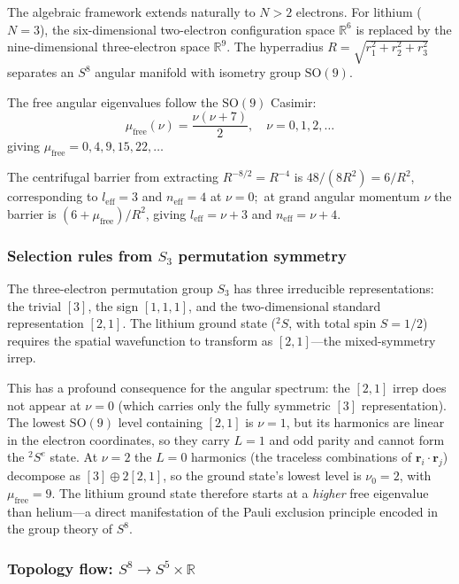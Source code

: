 \documentclass[aps,pra,twocolumn,superscriptaddress,longbibliography]{revtex4-2}
\begin{document}
The algebraic framework extends naturally to $N > 2$ electrons.
For lithium ($N = 3$), the six-dimensional two-electron
configuration space $\mathbb{R}^6$ is replaced by the
nine-dimensional three-electron space $\mathbb{R}^9$.  The
hyperradius $R = \sqrt{r_1^2 + r_2^2 + r_3^2}$ separates an
$S^8$ angular manifold with isometry group $\mathrm{SO}(9)$.

The free angular eigenvalues follow the $\mathrm{SO}(9)$ Casimir:
\begin{equation}
  \mu_{\mathrm{free}}(\nu) = \frac{\nu(\nu + 7)}{2},
  \quad \nu = 0, 1, 2, \ldots
  \label{eq:casimir_li}
\end{equation}
giving $\mu_{\mathrm{free}} = 0, 4, 9, 15, 22, \ldots$

The centrifugal barrier from extracting $R^{-8/2} = R^{-4}$
is $48/(8R^2) = 6/R^2$, corresponding to $l_{\mathrm{eff}} = 3$
and $n_{\mathrm{eff}} = 4$ at $\nu = 0$;\ at grand angular momentum
$\nu$ the barrier is $(6 + \mu_{\mathrm{free}})/R^2$, giving
$l_{\mathrm{eff}} = \nu + 3$ and $n_{\mathrm{eff}} = \nu + 4$.

\subsubsection{Selection rules from $S_3$ permutation symmetry}

The three-electron permutation group $S_3$ has three irreducible
representations: the trivial $[3]$, the sign $[1,1,1]$, and
the two-dimensional standard representation $[2,1]$.  The
lithium ground state (${}^2S$, with total spin $S = 1/2$) requires
the spatial wavefunction to transform as $[2,1]$---the
mixed-symmetry irrep.

This has a profound consequence for the angular spectrum: the
$[2,1]$ irrep does not appear at $\nu = 0$ (which carries only
the fully symmetric $[3]$ representation).  The lowest
$\mathrm{SO}(9)$ level containing $[2,1]$ is $\nu = 1$, but its
harmonics are linear in the electron coordinates, so they carry
$L = 1$ and odd parity and cannot form the ${}^2S^{e}$ state.  At
$\nu = 2$ the $L = 0$ harmonics (the traceless combinations of
$\bm{r}_i\cdot\bm{r}_j$) decompose as $[3] \oplus 2[2,1]$, so the
ground state's lowest level is $\nu_0 = 2$, with
$\mu_{\mathrm{free}} = 9$.  The lithium ground state therefore
starts at a \emph{higher} free eigenvalue than helium---a direct
manifestation of the Pauli exclusion principle encoded in the
group theory of $S^8$.

\subsubsection{Topology flow: $S^8 \to S^5 \times \mathbb{R}$}
\end{document}
